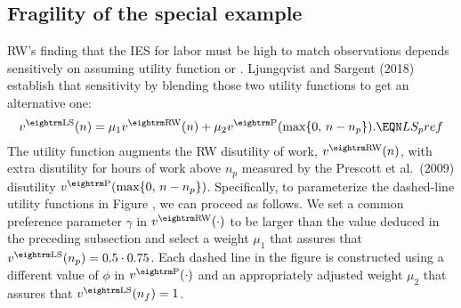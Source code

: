 \subsection{Fragility of the special example}

RW's finding that the IES for labor must be high to match
observations depends sensitively on assuming utility function  or
 .
Ljungqvist and Sargent (2018) establish that sensitivity by  blending those two utility functions
to get an  alternative one:
$$
v^{\rm LS}(n) = \mu_1 v^{\rm RW}(n) +
                 \mu_2 v^{\rm P}( \max \{0,\, n-n_p \} ).
                                                   \EQN LS_pref
$$
The utility function  augments the RW disutility of work,
$v^{\rm RW}(n)$,
with extra disutility for hours of work above $n_p$ measured
by the Prescott et al.\ (2009)   disutility
$v^{\rm P}( \max \{0,\, n-n_p \})$. Specifically, to parameterize
the dashed-line utility functions in Figure ,
we can proceed as follows.
We set a common preference parameter $\gamma$ in
$v^{\rm RW}(\cdot)$ to be larger than the
value deduced in the preceding subsection and select a weight
$\mu_1$ that assures that $v^{\rm LS}(n_p) = 0.5 \cdot 0.75$.
Each dashed line in the figure is constructed using a different value of $\phi$
in $v^{\rm P}(\cdot)$ and an appropriately adjusted  weight
$\mu_2$ that assures that $v^{\rm LS}(n_f) = 1$.



